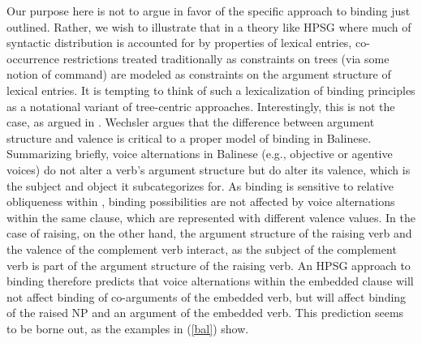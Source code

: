 \documentclass[output=paper]{langsci/langscibook}
\begin{document}
\eal
\label{a-st-bind}
\zl

Our purpose here is not to argue in favor of the specific approach to binding just outlined. Rather, we wish to illustrate that in a theory like HPSG where much of syntactic distribution is accounted for by properties of lexical entries, co-occurrence restrictions treated traditionally as constraints on trees (via some notion of command) are modeled as constraints on the argument structure of lexical entries. It is tempting to think of such a lexicalization of binding principles as a notational variant of tree-centric approaches. Interestingly, this is not the case, as argued in . Wechsler argues that the difference between argument structure and valence is critical to a proper model of binding in Balinese. Summarizing briefly, voice alternations in Balinese (e.g., objective or agentive voices) do not alter a verb's argument structure but do alter its valence, which is the subject and object it subcategorizes for. As binding is sensitive to relative obliqueness within , binding possibilities are not affected by voice alternations within the same clause, which are represented with different valence values. In the case of raising, on the other hand, the argument structure of the raising verb and the valence of the complement verb interact, as the subject of the complement verb is part of the argument structure of the raising verb. An HPSG approach to binding therefore predicts that voice alternations within the embedded clause will not affect binding of co-arguments of the embedded verb, but will affect binding of the raised NP and an argument of the embedded verb. This prediction seems to be borne out, as the examples in (\ref{bal}) show. 
\end{document}
